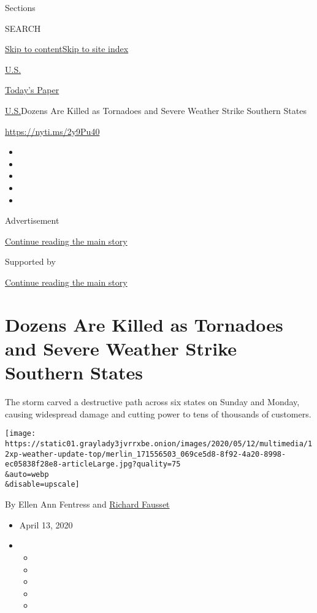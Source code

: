 Sections

SEARCH

\protect\hyperlink{site-content}{Skip to
content}\protect\hyperlink{site-index}{Skip to site index}

\href{https://www.nytimes3xbfgragh.onion/section/us}{U.S.}

\href{https://myaccount.nytimes3xbfgragh.onion/auth/login?response_type=cookie\&client_id=vi}{}

\href{https://www.nytimes3xbfgragh.onion/section/todayspaper}{Today's
Paper}

\href{/section/us}{U.S.}\textbar{}Dozens Are Killed as Tornadoes and
Severe Weather Strike Southern States

\url{https://nyti.ms/2y9Pu40}

\begin{itemize}
\item
\item
\item
\item
\item
\end{itemize}

Advertisement

\protect\hyperlink{after-top}{Continue reading the main story}

Supported by

\protect\hyperlink{after-sponsor}{Continue reading the main story}

\hypertarget{dozens-are-killed-as-tornadoes-and-severe-weather-strike-southern-states}{%
\section{Dozens Are Killed as Tornadoes and Severe Weather Strike
Southern
States}\label{dozens-are-killed-as-tornadoes-and-severe-weather-strike-southern-states}}

The storm carved a destructive path across six states on Sunday and
Monday, causing widespread damage and cutting power to tens of thousands
of customers.

\texttt{[image: https://static01.graylady3jvrrxbe.onion/images/2020/05/12/multimedia/12xp-weather-update-top/merlin\_171556503\_069ce5d8-8f92-4a20-8998-ec05838f28e8-articleLarge.jpg?quality=75\\\&auto=webp\\\&disable=upscale]}

By Ellen Ann Fentress and
\href{https://www.nytimes3xbfgragh.onion/by/richard-fausset}{Richard
Fausset}

\begin{itemize}
\item
  April 13, 2020
\item
  \begin{itemize}
  \item
  \item
  \item
  \item
  \item
  \end{itemize}
\end{itemize}


